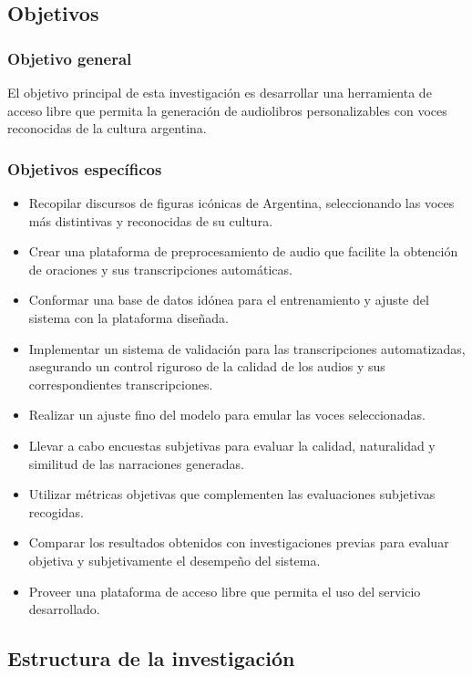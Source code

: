 \subsection{Objetivos}

\subsubsection{Objetivo general}

El objetivo principal de esta investigación es desarrollar una herramienta de acceso libre que permita la generación de audiolibros personalizables con voces reconocidas de la cultura  argentina.

\subsubsection{Objetivos específicos}

\begin{itemize}
    \item Recopilar discursos de figuras icónicas de Argentina, seleccionando las voces más distintivas y reconocidas de su cultura.
    \item Crear una plataforma de preprocesamiento de audio que facilite la obtención de oraciones y sus transcripciones automáticas.
    \item Conformar una base de datos idónea para el entrenamiento y ajuste del sistema con la plataforma diseñada.
    \item Implementar un sistema de validación para las transcripciones automatizadas, asegurando un control riguroso de la calidad de los audios y sus correspondientes transcripciones.
    \item Realizar un ajuste fino del modelo para emular las voces seleccionadas.
    \item Llevar a cabo encuestas subjetivas para evaluar la calidad, naturalidad y similitud de las narraciones generadas.
    \item Utilizar métricas objetivas que complementen las evaluaciones subjetivas recogidas.
    \item Comparar los resultados obtenidos con investigaciones previas para evaluar objetiva y subjetivamente el desempeño del sistema.
    \item Proveer una plataforma de acceso libre que permita el uso del servicio desarrollado.

\end{itemize}

\subsection{Estructura de la investigación}

